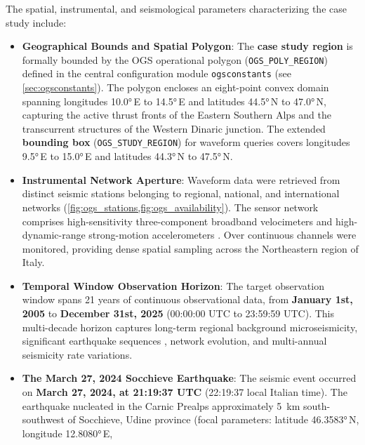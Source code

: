 The spatial, instrumental, and seismological parameters characterizing the case
study include:
\begin{itemize}
  \item \textbf{Geographical Bounds and Spatial Polygon}: The \textbf{case
    study region} is formally bounded by the \ac{OGS} operational polygon
    (\texttt{OGS\_POLY\_REGION}) defined in the central configuration module
    \texttt{ogsconstants} (see \cref{sec:ogsconstants}). The polygon encloses
    an eight-point convex domain spanning longitudes \ang{10.0}\,E to
    \ang{14.5}\,E and latitudes \ang{44.5}\,N to \ang{47.0}\,N, capturing the
    active thrust fronts of the Eastern Southern Alps and the transcurrent
    structures of the Western Dinaric junction. The extended \textbf{bounding
    box} (\texttt{OGS\_STUDY\_REGION}) for waveform queries covers longitudes
    \ang{9.5}\,E to \ang{15.0}\,E and latitudes \ang{44.3}\,N to \ang{47.5}\,N.
  \item \textbf{Instrumental Network Aperture}: Waveform data were retrieved
    from  distinct seismic stations belonging to
     regional, national, and international networks
    (\cref{fig:ogs_stations,fig:ogs_availability}). The sensor network
    comprises high-sensitivity three-component broadband velocimeters
     and
    high-dynamic-range strong-motion accelerometers . Over  continuous channels were
    monitored, providing dense spatial sampling across the Northeastern region
    of Italy.
  \item \textbf{Temporal Window Observation Horizon}: The target observation
    window spans \num{21} years of continuous observational data, from
    \textbf{January 1st, 2005} to \textbf{December 31st, 2025} (00:00:00 UTC to
    23:59:59 UTC). This multi-decade horizon captures long-term regional
    background microseismicity, significant earthquake sequences , network
    evolution, and multi-annual seismicity rate variations.
  \item \textbf{The March 27, 2024 Socchieve Earthquake}: The seismic event
    occurred on \textbf{March 27, 2024, at 21:19:37 UTC} (22:19:37 local
    Italian time). The earthquake nucleated in the Carnic Prealps approximately
    \qty{5}{\kilo\meter} south-southwest of Socchieve, Udine province (focal
      parameters: latitude \ang{46.3583}\,N, longitude \ang{12.8080}\,E,

\end{itemize}
